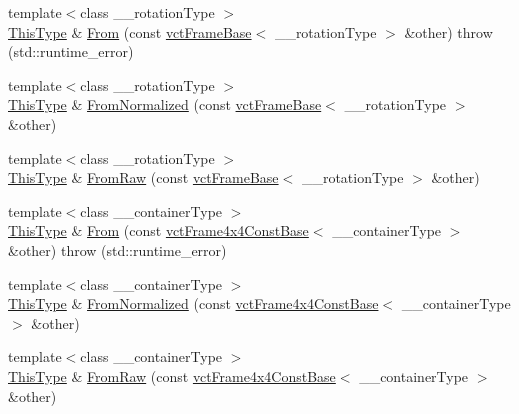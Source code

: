 \begin{DoxyCompactItemize}
\item 
{\footnotesize template$<$class \+\_\+\+\_\+rotation\+Type $>$ }\\\hyperlink{classvct_frame_base_a076f1fe4fc957faa0d1ff7450d1cb768}{This\+Type} \& \hyperlink{classvct_frame_base_a4537cd5e23393fde7e9211ab36e392f1}{From} (const \hyperlink{classvct_frame_base}{vct\+Frame\+Base}$<$ \+\_\+\+\_\+rotation\+Type $>$ \&other)  throw (std\+::runtime\+\_\+error)
\item 
{\footnotesize template$<$class \+\_\+\+\_\+rotation\+Type $>$ }\\\hyperlink{classvct_frame_base_a076f1fe4fc957faa0d1ff7450d1cb768}{This\+Type} \& \hyperlink{classvct_frame_base_acc35022fb94913d6bff04d70763bfc34}{From\+Normalized} (const \hyperlink{classvct_frame_base}{vct\+Frame\+Base}$<$ \+\_\+\+\_\+rotation\+Type $>$ \&other)
\item 
{\footnotesize template$<$class \+\_\+\+\_\+rotation\+Type $>$ }\\\hyperlink{classvct_frame_base_a076f1fe4fc957faa0d1ff7450d1cb768}{This\+Type} \& \hyperlink{classvct_frame_base_a3def45ce47d7a4b25844b6828aaa9ae7}{From\+Raw} (const \hyperlink{classvct_frame_base}{vct\+Frame\+Base}$<$ \+\_\+\+\_\+rotation\+Type $>$ \&other)
\end{DoxyCompactItemize}

{\bf }\par
\begin{DoxyCompactItemize}
\item 
{\footnotesize template$<$class \+\_\+\+\_\+container\+Type $>$ }\\\hyperlink{classvct_frame_base_a076f1fe4fc957faa0d1ff7450d1cb768}{This\+Type} \& \hyperlink{classvct_frame_base_a730a6f6e4a6f09cad8f14c9359cdba48}{From} (const \hyperlink{classvct_frame4x4_const_base}{vct\+Frame4x4\+Const\+Base}$<$ \+\_\+\+\_\+container\+Type $>$ \&other)  throw (std\+::runtime\+\_\+error)
\item 
{\footnotesize template$<$class \+\_\+\+\_\+container\+Type $>$ }\\\hyperlink{classvct_frame_base_a076f1fe4fc957faa0d1ff7450d1cb768}{This\+Type} \& \hyperlink{classvct_frame_base_af9e36e2855beb5c6339474f7a2bd15ad}{From\+Normalized} (const \hyperlink{classvct_frame4x4_const_base}{vct\+Frame4x4\+Const\+Base}$<$ \+\_\+\+\_\+container\+Type $>$ \&other)
\item 
{\footnotesize template$<$class \+\_\+\+\_\+container\+Type $>$ }\\\hyperlink{classvct_frame_base_a076f1fe4fc957faa0d1ff7450d1cb768}{This\+Type} \& \hyperlink{classvct_frame_base_a994b37869118a01d191f97d6a1c78cf8}{From\+Raw} (const \hyperlink{classvct_frame4x4_const_base}{vct\+Frame4x4\+Const\+Base}$<$ \+\_\+\+\_\+container\+Type $>$ \&other)
\end{DoxyCompactItemize}


